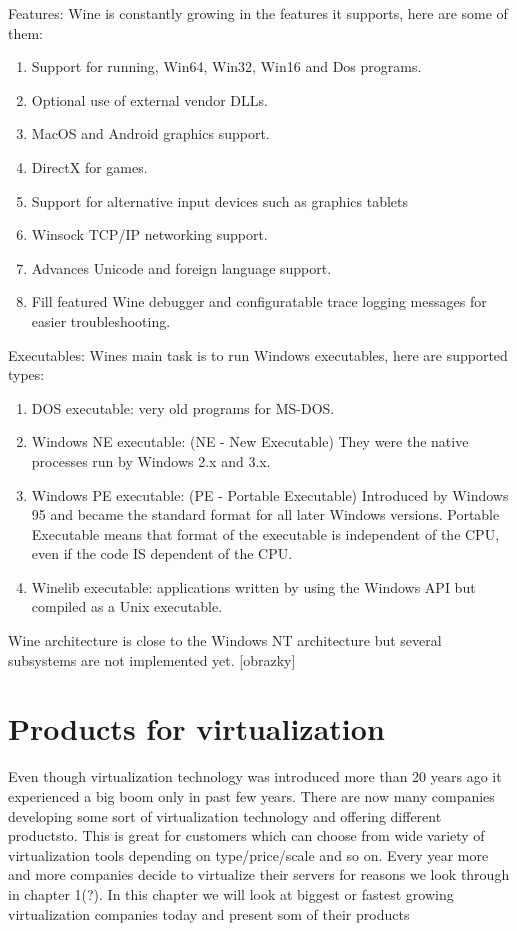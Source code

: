 Features:
Wine is constantly growing in the features it supports, here are some of them:
\begin{enumerate}
\item Support for running, Win64, Win32, Win16 and Dos programs.
\item Optional use of external vendor DLLs.
\item MacOS and Android graphics support.
\item DirectX for games.
\item Support for alternative input devices such as graphics tablets
\item Winsock TCP/IP networking support.
\item Advances Unicode and foreign language support.
\item Fill featured Wine debugger and configuratable trace logging messages for easier troubleshooting.
\end{enumerate}

Executables:
Wines main task is to run Windows executables, here are supported types:
\begin{enumerate}
\item DOS executable: very old programs for MS-DOS.
\item Windows NE executable: (NE - New Executable) They were the native processes run by Windows 2.x and 3.x.
\item Windows PE executable: (PE - Portable Executable) Introduced by Windows 95 and became the standard format for all later Windows versions. Portable Executable means that format of the executable is independent of the CPU, even if the code IS dependent of the CPU.
\item Winelib executable: applications written by using the Windows API but compiled as a Unix executable.
\end{enumerate}

Wine architecture is close to the Windows NT architecture but several subsystems are not implemented yet.
[obrazky]


\chapter{Products for virtualization}

Even though virtualization technology was introduced more than 20 years ago it experienced a big boom only in past few years. There are now many companies developing some sort of virtualization technology and offering different productsto. This is great for customers which can choose from wide variety of virtualization tools depending on type/price/scale and so on. Every year more and more companies decide to virtualize their servers for reasons we look through in chapter 1(?). In this chapter we will look at biggest or fastest growing virtualization companies today and present som of their products

